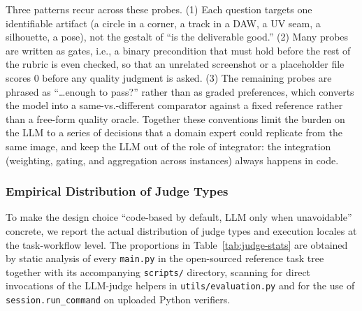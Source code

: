 \documentclass{llmxive}
\begin{document}
\noindent Three patterns recur across these probes. (1) Each question targets one identifiable artifact (a circle in a corner, a track in a DAW, a UV seam, a silhouette, a pose), not the gestalt of ``is the deliverable good.'' (2) Many probes are written as gates, i.e., a binary precondition that must hold before the rest of the rubric is even checked, so that an unrelated screenshot or a placeholder file scores $0$ before any quality judgment is asked. (3) The remaining probes are phrased as ``\dots enough to pass?'' rather than as graded preferences, which converts the model into a same-vs.-different comparator against a fixed reference rather than a free-form quality oracle. Together these conventions limit the burden on the LLM to a series of decisions that a domain expert could replicate from the same image, and keep the LLM out of the role of integrator: the integration (weighting, gating, and aggregation across instances) always happens in code.

\subsubsection{Empirical Distribution of Judge Types}
\label{app:eval-judge-stats}

To make the design choice ``code-based by default, LLM only when unavoidable'' concrete, we report the actual distribution of judge types and execution locales at the task-workflow level. The proportions in Table~\ref{tab:judge-stats} are obtained by static analysis of every \texttt{main.py} in the open-sourced reference task tree together with its accompanying \texttt{scripts/} directory, scanning for direct invocations of the LLM-judge helpers in \texttt{utils/evaluation.py} and for the use of \texttt{session.run\_command} on uploaded Python verifiers.
\end{document}
